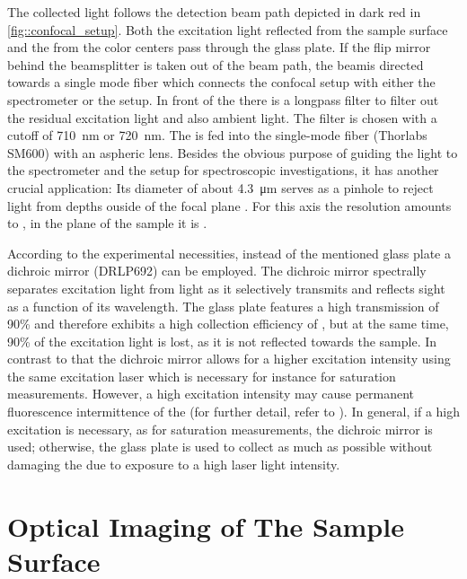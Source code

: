 		The collected light follows the detection beam path depicted in dark red in \autoref{fig::confocal_setup}.
		Both the excitation light reflected from the sample surface and the \fl from the color centers pass through the glass plate.
		If the flip mirror behind the beamsplitter is taken out of the beam path, the beamis directed towards a single mode fiber which connects the confocal setup with either the spectrometer or the \hbt setup. 
		In front of the \smf there is a longpass filter to filter out the residual excitation light and also ambient light.
		The filter is chosen with a cutoff \wl of \SI{710}{\nm} or \SI{720}{\nm}.
		The \fl is fed into the single-mode fiber (Thorlabs SM600) with an aspheric lens.
		Besides the obvious purpose of guiding the \pl light to the spectrometer and the \HBT setup for spectroscopic investigations, it has another crucial application:
		Its diameter of about \SI{4.3}{\micro\meter} serves as a pinhole to reject \pl light from depths ouside of the focal plane \cite{Santori2010}. 
		For this axis the resolution amounts to , in the plane of the sample it is .

		According to the experimental necessities, instead of the mentioned glass plate a dichroic mirror (DRLP692) can be employed.
		The dichroic mirror spectrally separates excitation light from \pl light as it selectively transmits and reflects sight as a function of its wavelength. 
		The glass plate features a high transmission of 90\% and therefore exhibits a high collection efficiency of \fl, but at the same time, 90\% of the excitation light is lost, as it is not reflected towards the sample.
		In contrast to that the dichroic mirror allows for a higher excitation intensity using the same excitation laser which is necessary for instance for saturation measurements. 
		However, a high excitation intensity may cause permanent fluorescence intermittence of the \sivs (for further detail, refer to ).
		In general, if a high excitation is necessary, as for saturation measurements, the dichroic mirror is used; otherwise, the glass plate is used to collect as much \fl as possible without damaging the \sivs due to exposure to a high laser light intensity.

	\section[Optical Imaging]{Optical Imaging of The Sample Surface} \label{sec::methods_optical}

